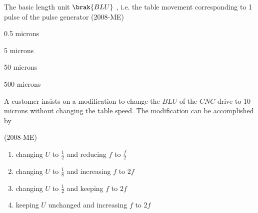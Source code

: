  \item The basic length unit $\brak{BLU}$
, i.e. the table movement corresponding to 1
 pulse of the pulse generator \label{84} \hfill(2008-ME)
 \begin{enumerate}
     \begin{multicols}{2}
         \item 0.5 microns
         \item 5 microns
         \item 50 microns
         \item 500 microns
     \end{multicols}
 \end{enumerate}
 \item A customer insists on a modification to change the $BLU$
 of the $CNC$
 drive to 10 microns without changing the table speed. The modification can be accomplished by \label{85} 

 \hfill(2008-ME)
 \begin{enumerate}
     \item changing $U$ to $\frac{1}{2}$ and reducing $f$ to $\frac{f}{2}$
     \item changing $U$ to $\frac{1}{8}$ and increasing $f$ to $2f$
     \item changing $U$ to $\frac{1}{2}$ and keeping $f$ to $2f$
     \item keeping  $U$ unchanged and increasing $f$ to $2f$
 \end{enumerate}
